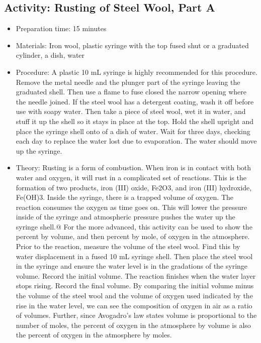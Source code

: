 \begin{itemize}
{\subsection{Activity: Rusting of Steel Wool, Part A}
\begin{itemize}
\item{Preparation time: 15 minutes}
\item{Materials: Iron wool, plastic syringe with the top fused shut or a graduated cylinder, a dish, water}
\item{Procedure: A plastic 10 mL syringe is highly recommended for this procedure. Remove the metal needle and the plunger part of the syringe leaving the graduated shell. Then use a flame to fuse closed the narrow opening where the needle joined. If the steel wool has a detergent coating, wash it off before use with soapy water. Then take a piece of steel wool, wet it in water, and stuff it up the shell so it stays in place at the top. Hold the shell upright and place the syringe shell onto of a dish of water. Wait for three days, checking each day to replace the water lost due to evaporation. The water should move up the syringe.}
\item{Theory: Rusting is a form of combustion. When iron is in contact with both water and oxygen, it will rust in a complicated set of reactions. This is the formation of two products, iron (III) oxide, Fe2O3, and iron (III) hydroxide, Fe(OH)3. Inside the syringe, there is a trapped volume of oxygen. The reaction consumes the oxygen as time goes on. This will lower the pressure inside of the syringe and atmospheric pressure pushes the water up the syringe shell.@	For the more advanced, this activity can be used to show the percent by volume, and then percent by mole, of oxygen in the atmosphere. Prior to the reaction, measure the volume of the steel wool. Find this by water displacement in a fused 10 mL syringe shell. Then place the steel wool in the syringe and ensure the water level is in the gradations of the syringe volume. Record the initial volume. The reaction finishes when the water layer stops rising. Record the final volume. By comparing the initial volume minus the volume of the steel wool and the volume of oxygen used indicated by the rise in the water level, we can see the composition of oxygen in air as a ratio of volumes. Further, since Avogadro’s law states volume is proportional to the number of moles, the percent of oxygen in the atmosphere by volume is also the percent of oxygen in the atmosphere by moles. }
\end{itemize}

}
\end{itemize}
